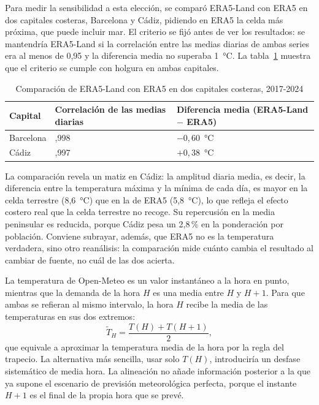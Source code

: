 Para medir la sensibilidad a esta elección, se comparó ERA5-Land con ERA5
en dos capitales costeras, Barcelona y Cádiz, pidiendo en ERA5 la celda más
próxima, que puede incluir mar. El criterio se fijó antes de ver los
resultados: se mantendría ERA5-Land si la correlación entre las medias
diarias de ambas series era al menos de 0,95 y la diferencia media no
superaba 1~°C. La tabla~\ref{tab:costa} muestra que el criterio se cumple
con holgura en ambas capitales.

\begin{table}[htbp]
	\centering
	\caption{Comparación de ERA5-Land con ERA5 en dos capitales costeras, 2017-2024}
	\label{tab:costa}
	\small
	\begin{tabularx}{0.85\textwidth}{l >{\centering\arraybackslash}X >{\centering\arraybackslash}X}
		\hline
		\textbf{Capital} & \textbf{Correlación de las medias diarias} & \textbf{Diferencia media (ERA5-Land $-$ ERA5)} \\
		\hline
		Barcelona & 0,998 & $-0{,}60$~°C \\
		Cádiz & 0,997 & $+0{,}38$~°C \\
		\hline
	\end{tabularx}
\end{table}

La comparación revela un matiz en Cádiz: la amplitud diaria media, es decir,
la diferencia entre la temperatura máxima y la mínima de cada día, es mayor
en la celda terrestre (8,6~°C) que en la de ERA5 (5,8~°C), lo que refleja el
efecto costero real que la celda terrestre no recoge. Su repercusión en la
media peninsular es reducida, porque Cádiz pesa un 2,8\,\% en la
ponderación por población. Conviene subrayar, además, que ERA5 no es la
temperatura verdadera, sino otro reanálisis: la comparación mide cuánto
cambia el resultado al cambiar de fuente, no cuál de las dos acierta.

La temperatura de Open-Meteo es un valor instantáneo a la hora en punto,
mientras que la demanda de la hora $H$ es una media entre $H$ y $H+1$. Para
que ambas se refieran al mismo intervalo, la hora $H$ recibe la media de las
temperaturas en sus dos extremos:
\begin{equation}
	\tilde{T}_H = \frac{T(H) + T(H+1)}{2},
\end{equation}
que equivale a aproximar la temperatura media de la hora por la regla del
trapecio. La alternativa más sencilla, usar solo $T(H)$, introduciría un
desfase sistemático de media hora. La alineación no añade información
posterior a la que ya supone el escenario de previsión meteorológica
perfecta, porque el instante $H+1$ es el final de la propia hora que se
prevé.

